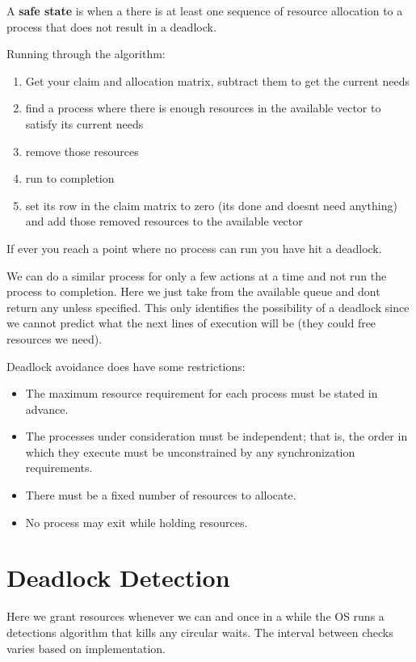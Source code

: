 \documentclass[12pt]{article}
\begin{document}
A \textbf{safe state} is when a there is at least one sequence of resource allocation to a process that does not result in a deadlock.

Running through the algorithm:
\begin{enumerate}
  \item Get your claim and allocation matrix, subtract them to get the current needs
  \item find a process where there is enough resources in the available vector to satisfy its current needs
  \item remove those resources
  \item run to completion
  \item set its row in the claim matrix to zero (its done and doesnt need anything) and add those removed resources to the available vector
\end{enumerate}
If ever you reach a point where no process can run you have hit a deadlock.

We can do a similar process for only a few actions at a time and not run the process to completion. Here we just take from the available queue and dont return any unless specified. This only identifies the possibility of a deadlock since we cannot predict what the next lines of execution will be (they could free resources we need).

Deadlock avoidance does have some restrictions:
\begin{itemize}
  \item The maximum resource requirement for each process must be stated in advance.
  \item The processes under consideration must be independent; that is, the order in which they execute must be unconstrained by any synchronization requirements.
  \item There must be a fixed number of resources to allocate.
  \item No process may exit while holding resources.
\end{itemize}

\section{Deadlock Detection}
Here we grant resources whenever we can and once in a while the OS runs a detections algorithm that kills any circular waits. The interval between checks varies based on implementation.
\end{document}
